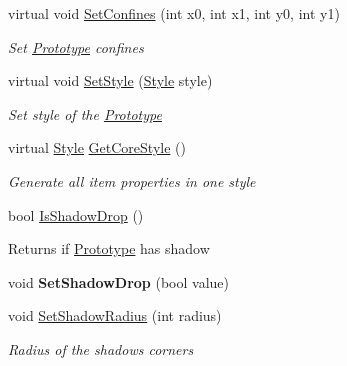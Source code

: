 \begin{DoxyCompactItemize}
virtual void \mbox{\hyperlink{class_space_v_i_l_1_1_prototype_ac409209f9adab44b149b5dff41bb2b00}{Set\+Confines}} (int x0, int x1, int y0, int y1)
\begin{DoxyCompactList}\small\item\em Set \mbox{\hyperlink{class_space_v_i_l_1_1_prototype}{Prototype}} confines \end{DoxyCompactList}\item 
virtual void \mbox{\hyperlink{class_space_v_i_l_1_1_prototype_ae96644a6ace490afb376fb542161e541}{Set\+Style}} (\mbox{\hyperlink{class_space_v_i_l_1_1_decorations_1_1_style}{Style}} style)
\begin{DoxyCompactList}\small\item\em Set style of the \mbox{\hyperlink{class_space_v_i_l_1_1_prototype}{Prototype}} \end{DoxyCompactList}\item 
virtual \mbox{\hyperlink{class_space_v_i_l_1_1_decorations_1_1_style}{Style}} \mbox{\hyperlink{class_space_v_i_l_1_1_prototype_a40a009a80bd8f8cda627d5fc819a608f}{Get\+Core\+Style}} ()
\begin{DoxyCompactList}\small\item\em Generate all item properties in one style \end{DoxyCompactList}\item 
\mbox{\label{class_space_v_i_l_1_1_prototype_ac573a0e0c2d1fb2ebe7305df61166ec2}} 
bool \mbox{\hyperlink{class_space_v_i_l_1_1_prototype_ac573a0e0c2d1fb2ebe7305df61166ec2}{Is\+Shadow\+Drop}} ()
\begin{DoxyCompactList}\small\item\em \begin{DoxyReturn}{Returns}
if \mbox{\hyperlink{class_space_v_i_l_1_1_prototype}{Prototype}} has shadow 
\end{DoxyReturn}
\end{DoxyCompactList}\item 
\mbox{\label{class_space_v_i_l_1_1_prototype_ad4b36bd593b9f42ae5f42c6d14b9afa9}} 
void {\bfseries Set\+Shadow\+Drop} (bool value)
\item 
void \mbox{\hyperlink{class_space_v_i_l_1_1_prototype_aad83d16c78da2247a6945e49eca1d6a0}{Set\+Shadow\+Radius}} (int radius)
\begin{DoxyCompactList}\small\item\em Radius of the shadows corners \end{DoxyCompactList}\item 

\end{DoxyCompactItemize}
